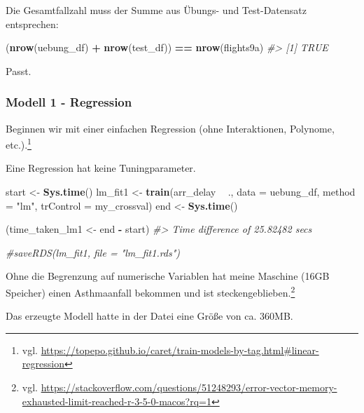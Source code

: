 \documentclass[]{article}
\newenvironment{Shaded}{\begin{snugshade}}{\end{snugshade}}
\newcommand{\CommentTok}[1]{\textcolor[rgb]{0.56,0.35,0.01}{\textit{#1}}}
\newcommand{\DataTypeTok}[1]{\textcolor[rgb]{0.13,0.29,0.53}{#1}}
\newcommand{\KeywordTok}[1]{\textcolor[rgb]{0.13,0.29,0.53}{\textbf{#1}}}
\newcommand{\NormalTok}[1]{#1}
\newcommand{\OperatorTok}[1]{\textcolor[rgb]{0.81,0.36,0.00}{\textbf{#1}}}
\newcommand{\StringTok}[1]{\textcolor[rgb]{0.31,0.60,0.02}{#1}}
\let\rmarkdownfootnote\footnote%
\def\footnote{\protect\rmarkdownfootnote}
\begin{document}
Die Gesamtfallzahl muss der Summe aus Übungs- und Test-Datensatz
entsprechen:

\begin{Shaded}
\begin{Highlighting}[]
\NormalTok{(}\KeywordTok{nrow}\NormalTok{(uebung_df) }\OperatorTok{+}\StringTok{ }\KeywordTok{nrow}\NormalTok{(test_df)) }\OperatorTok{==}\StringTok{ }\KeywordTok{nrow}\NormalTok{(flights9a)}
\CommentTok{#> [1] TRUE}
\end{Highlighting}
\end{Shaded}

Passt.

\hypertarget{modell-1---regression}{%
\subsubsection{Modell 1 - Regression}\label{modell-1---regression}}

Beginnen wir mit einer einfachen Regression (ohne Interaktionen,
Polynome, etc.).\footnote{vgl.
  \url{https://topepo.github.io/caret/train-models-by-tag.html\#linear-regression}}

Eine Regression hat keine Tuningparameter.

\begin{Shaded}
\begin{Highlighting}[]
\NormalTok{start <-}\StringTok{ }\KeywordTok{Sys.time}\NormalTok{()}
\NormalTok{lm_fit1 <-}\StringTok{ }\KeywordTok{train}\NormalTok{(arr_delay }\OperatorTok{~}\StringTok{ }\NormalTok{.,}
                 \DataTypeTok{data =}\NormalTok{ uebung_df,}
                 \DataTypeTok{method =} \StringTok{"lm"}\NormalTok{,}
                 \DataTypeTok{trControl =}\NormalTok{ my_crossval)}
\NormalTok{end <-}\StringTok{ }\KeywordTok{Sys.time}\NormalTok{()}

\NormalTok{(time_taken_lm1 <-}\StringTok{ }\NormalTok{end }\OperatorTok{-}\StringTok{ }\NormalTok{start)}
\CommentTok{#> Time difference of 25.82482 secs}


\CommentTok{#saveRDS(lm_fit1, file = "lm_fit1.rds")}
\end{Highlighting}
\end{Shaded}

Ohne die Begrenzung auf numerische Variablen hat meine Maschine (16GB
Speicher) einen Asthmaanfall bekommen und ist
steckengeblieben.\footnote{vgl.
  \url{https://stackoverflow.com/questions/51248293/error-vector-memory-exhausted-limit-reached-r-3-5-0-macos?rq=1}}

Das erzeugte Modell hatte in der Datei eine Größe von ca. 360MB.
\end{document}
